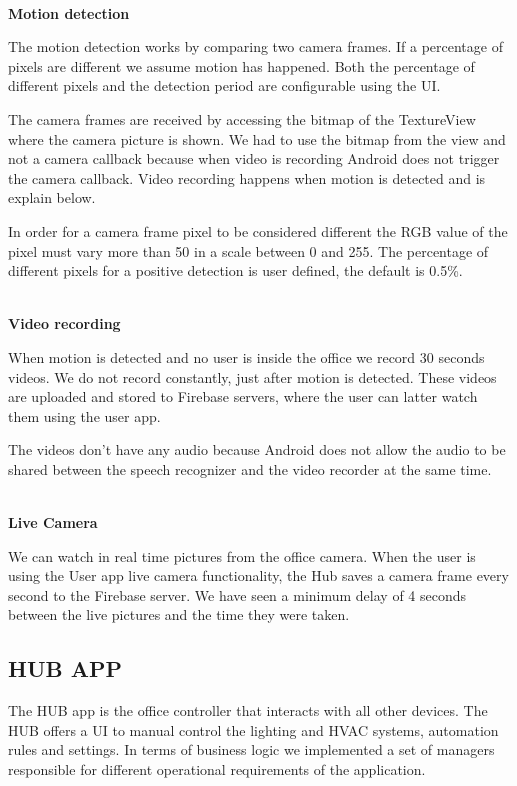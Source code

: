 \mbox{}\\
\textbf{Motion detection}

The motion detection works by comparing two camera frames. If a percentage of pixels are different we assume motion has happened. Both the percentage of different pixels and the detection period are configurable using the \ac{UI}.

The camera frames are received by accessing the bitmap of the TextureView where the camera picture is shown. We had to use the bitmap from the view and not a camera callback because when video is recording Android does not trigger the camera callback. Video recording happens when motion is detected and is explain below.

In order for a camera frame pixel to be considered different the RGB value of the pixel must vary more than 50 in a scale between 0 and 255. The percentage of different pixels for a positive detection is user defined, the default is 0.5\%.


\mbox{}\\
\textbf{Video recording}

When motion is detected and no user is inside the office we record 30 seconds videos. We do not record constantly, just after motion is detected. These videos are uploaded and stored to Firebase servers, where the user can latter watch them using the user app.

The videos don't have any audio because Android does not allow the audio to be shared between the speech recognizer and the video recorder at the same time.


\mbox{}\\
\textbf{Live Camera}

We can watch in real time pictures from the office camera. When the user is using the User app live camera functionality, the Hub saves a camera frame every second to the Firebase server. We have seen a minimum delay of 4 seconds between the live pictures and the time they were taken.


\subsection{HUB APP}



The HUB app is the office controller that interacts with all other devices. The HUB offers a \ac{UI} to manual control the lighting and \ac{HVAC} systems, automation rules and settings. In terms of business logic we implemented a set of managers responsible for different operational requirements of the application.


